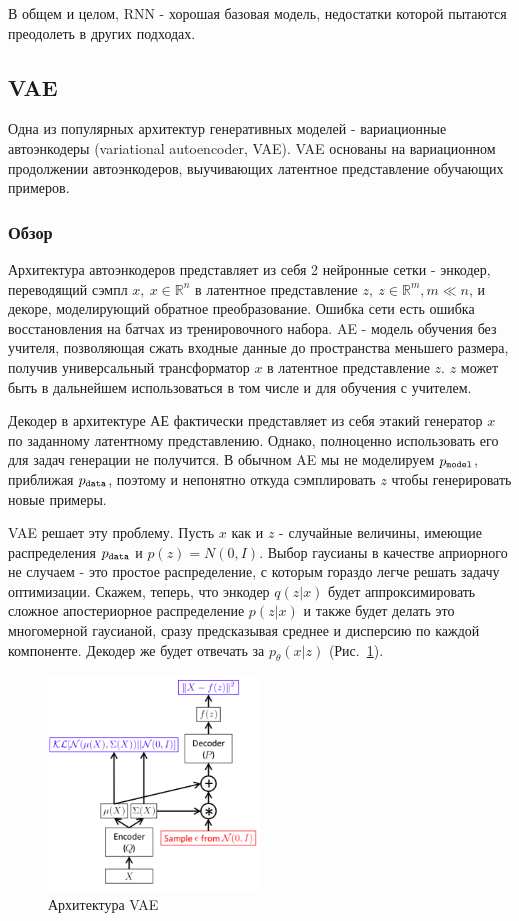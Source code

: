 \documentclass{spbau-diploma}
\begin{document}
В общем и целом, RNN - хорошая базовая модель, недостатки которой пытаются 
преодолеть в других подходах.

\subsection{VAE}
Одна из популярных архитектур генеративных моделей - вариационные автоэнкодеры
(variational autoencoder, VAE). VAE основаны на вариационном продолжении 
автоэнкодеров, выучивающих латентное представление обучающих примеров.

\subsubsection{Обзор}
Архитектура автоэнкодеров представляет из себя 2 нейронные сетки - энкодер, 
переводящий сэмпл $x,~x \in \mathbb{R}^n$ в латентное представление $z,~z \in \mathbb{R}^m, m \ll n$, и декоре, моделирующий обратное преобразование. 
Ошибка сети есть ошибка восстановления на батчах из тренировочного набора. AE -
модель обучения без учителя, позволяющая сжать входные данные до пространства
меньшего размера, получив универсальный трансформатор $x$ в латентное 
представление $z$. $z$ может быть в дальнейшем использоваться в том числе и для
обучения с учителем.

Декодер в архитектуре АЕ фактически представляет из себя этакий генератор $x$
по заданному латентному представлению. Однако, полноценно использовать его для
задач генерации не получится. В обычном AE мы не моделируем $p_{\texttt{model}}$, 
приближая $p_{\texttt{data}}$, поэтому и непонятно откуда сэмплировать $z$ чтобы 
генерировать новые примеры. 

VAE решает эту проблему. Пусть $x$ как и $z$ - случайные величины, имеющие
распределения $p_{\texttt{data}}$ и $p(z) = N(0, I)$. Выбор гаусианы в качестве априорного
не случаем - это простое распределение, с которым гораздо легче решать задачу
оптимизации. Скажем, теперь, что энкодер $q(z|x)$ будет аппроксимировать сложное 
апостериорное распределение $p(z|x)$ и также будет делать это многомерной
гаусианой, сразу предсказывая среднее и дисперсию по каждой компоненте. Декодер
же будет отвечать за $p_{\theta}(x|z)$ (Рис.~\ref{vae_terms}). 

\begin{figure}[h]
\centering
\includegraphics[width=0.5\textwidth]{images/vae_terms.png}
\caption{Архитектура VAE}
\label{vae_terms}
\end{figure}
\end{document}
